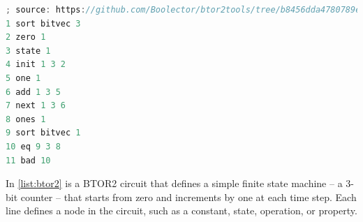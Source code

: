 \lstset{style=mystyle}
\begin{lstlisting}[language=Verilog, 
  caption=BTOR2 example,
  label={list:btor2}]
; source: https://github.com/Boolector/btor2tools/tree/b8456dda4780789e882f5791eb486f295ade4da4/examples/btorsim
1 sort bitvec 3
2 zero 1
3 state 1
4 init 1 3 2
5 one 1
6 add 1 3 5
7 next 1 3 6
8 ones 1
9 sort bitvec 1
10 eq 9 3 8
11 bad 10
\end{lstlisting}

In \autoref{list:btor2} is a BTOR2 circuit that defines a simple finite state machine -- a 3-bit counter -- that starts from zero and increments by one at each time step. Each line defines a node in the circuit, such as a constant, state, operation, or property.







